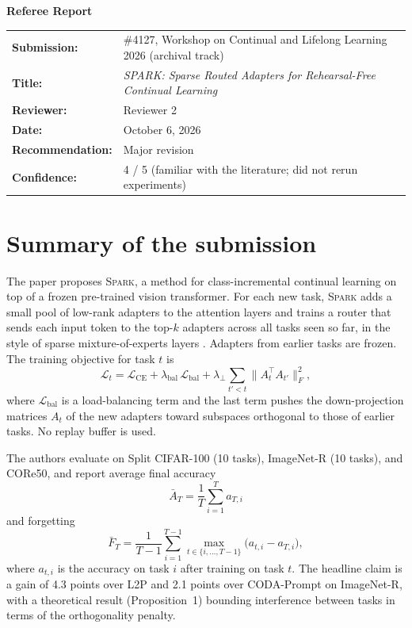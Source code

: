 \documentclass[11pt]{article}
\newcommand{\paper}{\textsc{Spark}}
\begin{document}
\begin{center}
  {\Large\bfseries Referee Report}\\[6pt]
  \begin{tabular}{@{}ll@{}}
    \textbf{Submission:} & \#4127, Workshop on Continual and Lifelong Learning 2026 (archival track) \\
    \textbf{Title:} & \emph{SPARK: Sparse Routed Adapters for Rehearsal-Free Continual Learning} \\
    \textbf{Reviewer:} & Reviewer 2 \\
    \textbf{Date:} & October 6, 2026 \\
    \textbf{Recommendation:} & Major revision \\
    \textbf{Confidence:} & 4 / 5 (familiar with the literature; did not rerun experiments)
  \end{tabular}
\end{center}

\section{Summary of the submission}

The paper proposes \paper{}, a method for class-incremental continual learning on top of a frozen pre-trained vision transformer. For each new task, \paper{} adds a small pool of low-rank adapters \citep{hu2022lora} to the attention layers and trains a router that sends each input token to the top-$k$ adapters across all tasks seen so far, in the style of sparse mixture-of-experts layers \citep{shazeer2017,fedus2022}. Adapters from earlier tasks are frozen. The training objective for task $t$ is
\begin{equation}\label{eq:loss}
  \mathcal{L}_t = \mathcal{L}_\text{CE} + \lambda_\text{bal}\,\mathcal{L}_\text{bal}
  + \lambda_\perp \sum_{t' < t} \bigl\lVert A_t^{\top} A_{t'} \bigr\rVert_F^2,
\end{equation}
where $\mathcal{L}_\text{bal}$ is a load-balancing term and the last term pushes the down-projection matrices $A_t$ of the new adapters toward subspaces orthogonal to those of earlier tasks. No replay buffer is used.

The authors evaluate on Split CIFAR-100 (10 tasks), ImageNet-R (10 tasks), and CORe50, and report average final accuracy
\begin{equation}\label{eq:acc}
  \bar{A}_T = \frac{1}{T}\sum_{i=1}^{T} a_{T,i}
\end{equation}
and forgetting
\begin{equation}\label{eq:forget}
  \bar{F}_T = \frac{1}{T-1}\sum_{i=1}^{T-1} \max_{t \in \{i, \dots, T-1\}} \bigl(a_{t,i} - a_{T,i}\bigr),
\end{equation}
where $a_{t,i}$ is the accuracy on task $i$ after training on task $t$. The headline claim is a gain of 4.3 points over L2P \citep{wang2022l2p} and 2.1 points over CODA-Prompt \citep{smith2023coda} on ImageNet-R, with a theoretical result (Proposition~1) bounding interference between tasks in terms of the orthogonality penalty.
\end{document}

